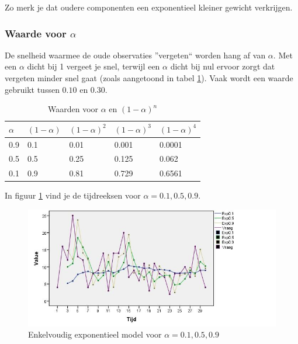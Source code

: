 Zo merk je dat oudere componenten een exponentieel kleiner gewicht verkrijgen. 

\subsubsection{Waarde voor $\alpha$}
De snelheid waarmee de oude observaties ''vergeten`` worden hang af van $\alpha$. Met een $\alpha$ dicht bij 1 vergeet je snel, terwijl een $\alpha$ dicht bij nul ervoor zorgt dat vergeten minder snel gaat (zoals aangetoond in tabel \ref{tab:alpha}). Vaak wordt een waarde gebruikt tussen $0.10$ en $0.30$.

\begin{table}
\centering
    \begin{tabular}{l|llll}
    $\alpha$ & $(1-\alpha)$ & $(1-\alpha)^{2}$ & $(1-\alpha)^{3}$ & $(1-\alpha)^{4}$ \\ \hline
    0.9   & 0.1       & 0.01             & 0.001                      & 0.0001           \\
    0.5   & 0.5       & 0.25             & 0.125                      & 0.062            \\
    0.1   & 0.9       & 0.81             & 0.729                      & 0.6561           \\
    \end{tabular}
		\caption{Waarden voor $\alpha$ en $(1-\alpha)^{n}$}
		\label{tab:alpha}
\end{table}
 
In figuur \ref{fig:tijdreeks51} vind je de tijdreeksen voor $\alpha=0.1 , 0.5, 0.9$.  

\begin{figure}[htbp]
	\centering
		\includegraphics[width=1.00\textwidth]{images/tijdsreeksen/tijdsreeks51.jpg}
	\caption{Enkelvoudig exponentieel model voor $\alpha=0.1 , 0.5, 0.9$}
	\label{fig:tijdreeks51}
\end{figure}

